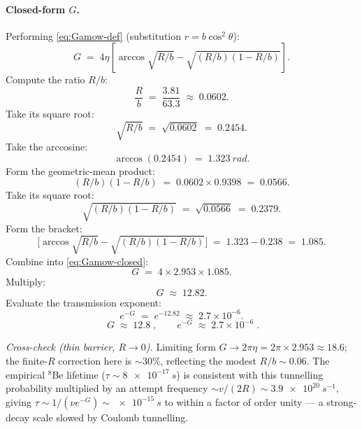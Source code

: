 \documentclass[11pt]{article}
\begin{document}
\paragraph{Closed-form $G$.} Performing \eqref{eq:Gamow-def} (substitution $r=b\cos^{2}\theta$):
\begin{equation}
G\;=\;4\eta\!\left[\arccos\!\sqrt{R/b}-\sqrt{(R/b)(1-R/b)}\right].
\label{eq:Gamow-closed}
\end{equation}
Compute the ratio $R/b$:
\[
\frac{R}{b}\;=\;\frac{3.81}{63.3}\;\approx\;0.0602.
\]
Take its square root:
\[
\sqrt{R/b}\;=\;\sqrt{0.0602}\;=\;0.2454.
\]
Take the arccosine:
\[
\arccos(0.2454)\;=\;\SI{1.323}{rad}.
\]
Form the geometric-mean product:
\[
(R/b)(1-R/b)\;=\;0.0602\times 0.9398\;=\;0.0566.
\]
Take its square root:
\[
\sqrt{(R/b)(1-R/b)}\;=\;\sqrt{0.0566}\;=\;0.2379.
\]
Form the bracket:
\[
\bigl[\arccos\sqrt{R/b}-\sqrt{(R/b)(1-R/b)}\bigr]\;=\;1.323-0.238\;=\;1.085.
\]
Combine into \eqref{eq:Gamow-closed}:
\[
G\;=\;4\times 2.953\times 1.085.
\]
Multiply:
\[
G\;\approx\;12.82.
\]
Evaluate the transmission exponent:
\[
e^{-G}\;=\;e^{-12.82}\;\approx\;2.7\times 10^{-6}.
\]
\begin{equation}
\boxed{\;G\;\approx\;12.8\;,\qquad e^{-G}\;\approx\;2.7\times 10^{-6}\;.}
\label{eq:Gamow-final}
\end{equation}

\emph{Cross-check (thin barrier, $R\to 0$).} Limiting form $G\to 2\pi\eta=2\pi\times 2.953\approx 18.6$; the finite-$R$ correction here is $\sim 30\%$, reflecting the modest $R/b\sim 0.06$. The empirical $^{8}$Be lifetime ($\tau\sim\SI{8e-17}{s}$) is consistent with this tunnelling probability multiplied by an attempt frequency $\sim v/(2R)\sim\SI{3.9e20}{s^{-1}}$, giving $\tau\sim 1/(\nu e^{-G})\sim\SI{e-15}{s}$ to within a factor of order unity --- a strong-decay scale slowed by Coulomb tunnelling.
\end{document}
